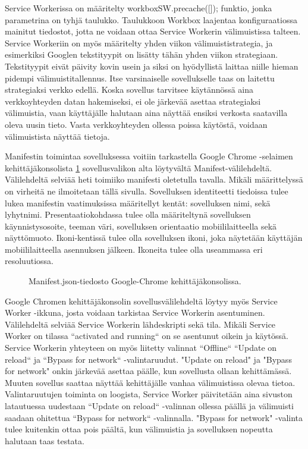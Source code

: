 \documentclass{tktltiki}
\begin{document}
Service Workerissa on määritelty workboxSW.precache([]); funktio, jonka parametrina on tyhjä taulukko. Taulukkoon Workbox laajentaa konfiguraatiossa mainitut tiedostot, jotta ne voidaan ottaa Service Workerin välimuistissa talteen. Service Workeriin on myös määritelty yhden viikon välimuististrategia, ja esimerkiksi Googlen tekstityypit on lisätty tähän yhden viikon strategiaan. Tekstityypit eivät päivity kovin usein ja siksi on hyödyllistä laittaa niille hieman pidempi välimuistitallennus. Itse varsinaiselle sovellukselle taas on laitettu strategiaksi verkko edellä. Koska sovellus tarvitsee käytännössä aina verkkoyhteyden datan hakemiseksi, ei ole järkevää asettaa strategiaksi välimuistia, vaan käyttäjälle halutaan aina näyttää ensiksi verkosta saatavilla oleva uusin tieto. Vasta verkkoyhteyden ollessa poissa käytöstä, voidaan välimuistista näyttää tietoja. 

Manifestin toimintaa sovelluksessa voitiin tarkastella Google Chrome -selaimen kehittäjäkonsolista \ref{Manifest.json} sovellusvalikon alta löytyvältä Manifest-välilehdeltä. Välilehdeltä selviää heti toimiiko manifesti oletetulla tavalla. Mikäli määrittelyssä on virheitä ne ilmoitetaan tällä sivulla. Sovelluksen identiteetti tiedoissa tulee lukea manifestin vaatimuksissa määritellyt kentät: sovelluksen nimi, sekä lyhytnimi. Presentaatiokohdassa tulee olla määriteltynä sovelluksen käynnistysosoite, teeman väri, sovelluksen orientaatio mobiililaitteella sekä näyttömuoto. Ikoni-kentissä tulee olla sovelluksen ikoni, joka näytetään käyttäjän mobiililaitteella asennuksen jälkeen. Ikoneita tulee olla useammassa eri resoluutiossa. 

\begin{figure}[h]
\begin{center}
\caption{Manifest.json-tiedosto Google-Chrome kehittäjäkonsolissa.}
\label{Manifest.json}
\end{center}
\end{figure}
\clearpage

Google Chromen kehittäjäkonsolin sovellusvälilehdeltä löytyy myös Service Worker -ikkuna, josta voidaan tarkistaa Service Workerin asentuminen. Välilehdeltä selviää Service Workerin lähdeskripti sekä tila. Mikäli Service Worker on tilassa “activated and running“ on se asentunut oikein ja käytössä. Service Workerin yhteyteen on myös liitetty valinnat “Offline“ “Update on reload“ ja “Bypass for network“ -valintaruudut. "Update on reload" ja "Bypass for network" onkin järkevää asettaa päälle, kun sovellusta ollaan kehittämässä. Muuten sovellus saattaa näyttää kehittäjälle vanhaa välimuistissa olevaa tietoa. Valintaruutujen toiminta on loogista, Service Worker päivitetään aina sivuston latautuessa uudestaan “Update on reload“ -valinnan ollessa päällä ja välimuisti saadaan ohitettua “Bypass for network“ -valinnalla. "Bypass for network" -valinta tulee kuitenkin ottaa pois päältä, kun välimuistia ja sovelluksen nopeutta halutaan taas testata.
\end{document}
